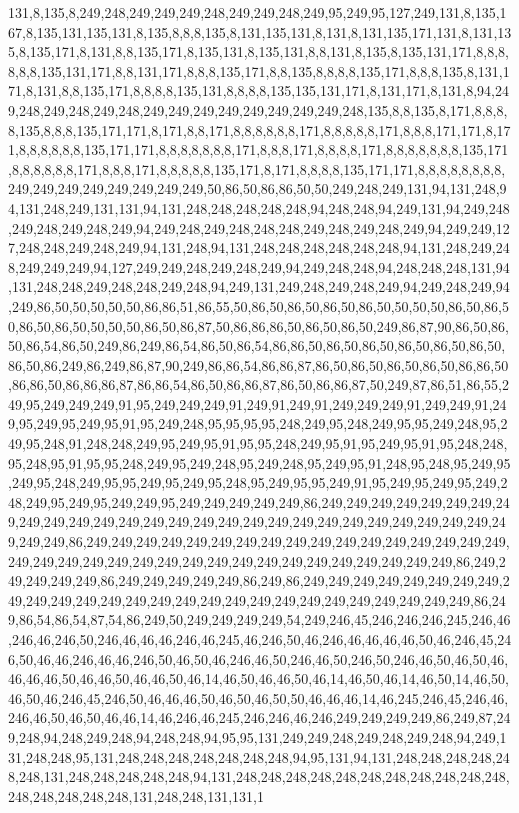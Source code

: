 131,8,135,8,249,248,249,249,249,248,249,249,248,249,95,249,95,127,249,131,8,135,167,8,135,131,135,131,8,135,8,8,8,135,8,131,135,131,8,131,8,131,135,171,131,8,131,135,8,135,171,8,131,8,8,135,171,8,135,131,8,135,131,8,8,131,8,135,8,135,131,171,8,8,8,8,8,8,135,131,171,8,8,131,171,8,8,8,135,171,8,8,135,8,8,8,8,135,171,8,8,8,135,8,131,171,8,131,8,8,135,171,8,8,8,8,135,131,8,8,8,8,135,135,131,171,8,131,171,8,131,8,94,249,248,249,248,249,248,249,249,249,249,249,249,249,249,248,135,8,8,135,8,171,8,8,8,8,135,8,8,8,135,171,171,8,171,8,8,171,8,8,8,8,8,8,171,8,8,8,8,8,171,8,8,8,171,171,8,171,8,8,8,8,8,8,135,171,171,8,8,8,8,8,8,8,171,8,8,8,171,8,8,8,8,171,8,8,8,8,8,8,8,135,171,8,8,8,8,8,8,171,8,8,8,171,8,8,8,8,8,135,171,8,171,8,8,8,8,135,171,171,8,8,8,8,8,8,8,8,249,249,249,249,249,249,249,249,50,86,50,86,86,50,50,249,248,249,131,94,131,248,94,131,248,249,131,131,94,131,248,248,248,248,248,94,248,248,94,249,131,94,249,248,249,248,249,248,249,94,249,248,249,248,248,248,249,248,249,248,249,94,249,249,127,248,248,249,248,249,94,131,248,94,131,248,248,248,248,248,248,94,131,248,249,248,249,249,249,94,127,249,249,248,249,248,249,94,249,248,248,94,248,248,248,131,94,131,248,248,249,248,248,249,248,94,249,131,249,248,249,248,249,94,249,248,249,94,249,86,50,50,50,50,50,86,86,51,86,55,50,86,50,86,50,86,50,86,50,50,50,50,86,50,86,50,86,50,86,50,50,50,50,86,50,86,87,50,86,86,86,50,86,50,86,50,249,86,87,90,86,50,86,50,86,54,86,50,249,86,249,86,54,86,50,86,54,86,86,50,86,50,86,50,86,50,86,50,86,50,86,50,86,249,86,249,86,87,90,249,86,86,54,86,86,87,86,50,86,50,86,50,86,50,86,86,50,86,86,50,86,86,86,87,86,86,54,86,50,86,86,87,86,50,86,86,87,50,249,87,86,51,86,55,249,95,249,249,249,91,95,249,249,249,91,249,91,249,91,249,249,249,91,249,249,91,249,95,249,95,249,95,91,95,249,248,95,95,95,95,248,249,95,248,249,95,95,249,248,95,249,95,248,91,248,248,249,95,249,95,91,95,95,248,249,95,91,95,249,95,91,95,248,248,95,248,95,91,95,95,248,249,95,249,248,95,249,248,95,249,95,91,248,95,248,95,249,95,249,95,248,249,95,95,249,95,249,95,248,95,249,95,95,249,91,95,249,95,249,95,249,248,249,95,249,95,249,249,95,249,249,249,249,249,86,249,249,249,249,249,249,249,249,249,249,249,249,249,249,249,249,249,249,249,249,249,249,249,249,249,249,249,249,249,249,86,249,249,249,249,249,249,249,249,249,249,249,249,249,249,249,249,249,249,249,249,249,249,249,249,249,249,249,249,249,249,249,249,249,249,249,86,249,249,249,249,249,86,249,249,249,249,249,86,249,86,249,249,249,249,249,249,249,249,249,249,249,249,249,249,249,249,249,249,249,249,249,249,249,249,249,249,249,86,249,86,54,86,54,87,54,86,249,50,249,249,249,249,54,249,246,45,246,246,246,245,246,46,246,46,246,50,246,46,46,46,246,46,245,46,246,50,46,246,46,46,46,46,50,46,246,45,246,50,46,46,246,46,46,246,50,46,50,46,246,46,50,246,46,50,246,50,246,46,50,46,50,46,46,46,46,50,46,46,50,46,46,50,46,14,46,50,46,46,50,46,14,46,50,46,14,46,50,14,46,50,46,50,46,246,45,246,50,46,46,46,50,46,50,46,50,50,46,46,46,14,46,245,246,45,246,46,246,46,50,46,50,46,46,14,46,246,46,245,246,246,46,246,249,249,249,249,86,249,87,249,248,94,248,249,248,94,248,248,94,95,95,131,249,249,248,249,248,249,248,94,249,131,248,248,95,131,248,248,248,248,248,248,248,94,95,131,94,131,248,248,248,248,248,248,131,248,248,248,248,248,94,131,248,248,248,248,248,248,248,248,248,248,248,248,248,248,248,248,131,248,248,131,131,1